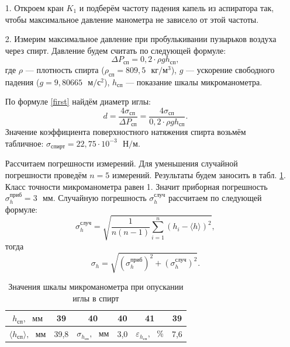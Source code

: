 \documentclass[a4paper, 12pt]{article}
\begin{document}
    \begin{enumerate}
    
        \item[1.] Откроем кран $K_1$ и подберём частоту падения капель из аспиратора так, чтобы максимальное давление манометра не зависело от этой частоты.
        
        \item[2.] Измерим максимальное давление при пробулькивании пузырьков воздуха через спирт. Давление будем считать по следующей формуле:
        \begin{equation}
            \Delta P_{сп} = 0,2 \cdot \rho g h_{сп},
            \label{eq2}
        \end{equation}
        где $\rho$ — плотность спирта ($\rho_{сп} = 809,5 \text{ } кг/м^3$), $g$ — ускорение свободного падения ($g = 9,80665 \text{ } м/с^2$), $h_{сп}$ — показание шкалы микроманометра.
        
        По формуле \eqref{first} найдём диаметр иглы:
        \begin{equation}
            d = \frac{4 \sigma_{сп}}{\Delta P_{сп}} = \frac{4 \sigma_{сп}}{0,2 \cdot \rho g h_{сп}}.
            \label{eq3}
        \end{equation}
        Значение коэффициента поверхностного натяжения спирта возьмём табличное: $\sigma_{спирт} = 22,75 \cdot 10^{-3} \text{ } Н/м$.
        
        Рассчитаем погрешности измерений. Для уменьшения случайной погрешности проведём $n = 5$ измерений. Результаты будем заносить в табл. \ref{table1}. Класс точности микроманометра равен 1. Значит приборная погрешность $\sigma_h^{приб} = 3 \text{ } мм$. Случайную погрешность $\sigma_h^{случ}$ рассчитаем по следующей формуле:
        \begin{equation}
            \sigma_h^{случ} = \sqrt{\frac{1}{n (n - 1)} \sum_{i = 1}^n (h_i - \langle h \rangle)^2},
        \end{equation}
        тогда
        \begin{equation}
            \sigma_h = \sqrt{(\sigma_h^{приб})^2 + (\sigma_h^{случ})^2}.
        \end{equation}
        
        \begin{table}[ht]
            \centering
            \begin{tabular}{|c|c|c|c|c|c|}
                \hline
                $h_{сп}, \text{ } мм$ & 39 & 40 & 40 & 41 & 39 \\
                \hline
                $\langle h_{сп} \rangle, \text{ } мм$ & 39,8 & $\sigma_{h_{сп}}, \text{ } мм$ & 3,0 & $\varepsilon_{h_{сп}}, \text{ } \%$ & 7,6 \\
                \hline
            \end{tabular}
            \caption{Значения шкалы микроманометра при опускании иглы в спирт}
            \label{table1}
        \end{table}
        

\end{enumerate}
\end{document}
